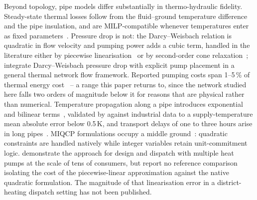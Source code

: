 Beyond topology, pipe models differ substantially in thermo-hydraulic fidelity.
Steady-state thermal losses follow from the fluid--ground temperature difference and the
pipe insulation, and are MILP-compatible whenever temperatures enter as fixed
parameters~\cite{Frederiksen2013}. Pressure drop is not: the Darcy--Weisbach relation is
quadratic in flow velocity and pumping power adds a cubic term, handled in the literature
either by piecewise linearisation~\cite{Bordin2016} or by second-order cone
relaxation~\cite{Blommaert2020}; \citet{Hari2024} integrate Darcy--Weisbach pressure drop
with explicit pump placement in a general thermal network flow framework. Reported pumping
costs span 1--5\,\% of thermal energy cost~\cite{Frederiksen2013} -- a range this paper
returns to, since the network studied here falls two orders of magnitude below it for
reasons that are physical rather than numerical. Temperature propagation along a pipe
introduces exponential and bilinear terms~\cite{vanderHeijde2017}, validated by
\citet{Maldonado2024} against industrial data to a supply-temperature mean absolute error
below 0.5\,K, and transport delays of one to three hours arise in long
pipes~\cite{Giraud2015}. MIQCP formulations occupy a middle ground~\cite{Ommen2016}:
quadratic constraints are handled natively while integer variables retain
unit-commitment logic. \citet{Hering2021} demonstrate the approach for design and
dispatch with multiple heat pumps at the scale of tens of consumers, but report no
reference comparison isolating the cost of the piecewise-linear approximation against the
native quadratic formulation. The magnitude of that linearisation error in a
district-heating dispatch setting has not been published.


